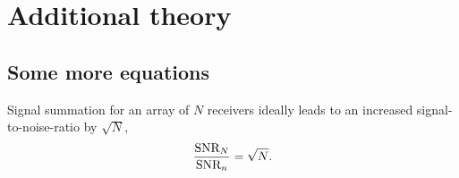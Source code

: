 \chapter{Additional theory}\label{app:theory}


\section{Some more equations}\label{app:theory:more}
%
Signal summation for an array of $N$ receivers ideally leads to an increased signal-to-noise-ratio by $\sqrt{N}$,
\begin{equation*}
	\dfrac{\text{SNR}_{N}}{\text{SNR}_{n}}= \sqrt{N}.
\end{equation*}